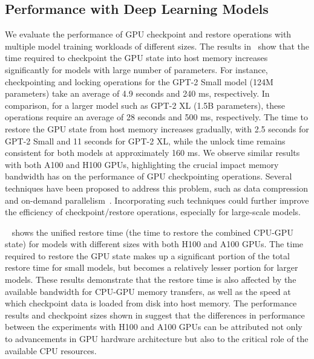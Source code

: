 \subsection{\sys Performance with Deep Learning Models}
\label{sec:eval:diff-models}
%
We evaluate the performance of GPU checkpoint and restore operations with multiple model training workloads of different sizes. The results in~ show that the time required to checkpoint the GPU state into host memory increases significantly for models with large number of parameters.
For instance, checkpointing and locking operations for the GPT-2 Small model (124M parameters) take an average of 4.9 seconds and 240 ms, respectively. In comparison, for a larger model such as GPT-2 XL (1.5B parameters), these operations require an average of 28 seconds and 500 ms, respectively.
The time to restore the GPU state from host memory increases gradually, with 2.5 seconds for GPT-2 Small and 11 seconds for GPT-2 XL, while the unlock time remains consistent for both models at approximately 160 ms.
We observe similar results with both A100 and H100 GPUs, highlighting the crucial impact memory bandwidth has on the performance of GPU checkpointing operations.
Several techniques have been proposed to address this problem, such as data compression and on-demand parallelism~\cite{yang2024on-demand}. Incorporating such techniques could further improve the efficiency of checkpoint/restore operations, especially for large-scale models.

~ shows the unified restore time (the time to restore the combined CPU-GPU state) for models with different sizes with both H100 and A100 GPUs. The time required to restore the GPU state makes up a significant portion of the total restore time for small models, but becomes a relatively lesser portion for larger models. These results demonstrate that the restore time is also affected by the available bandwidth for CPU-GPU memory transfers, as well as the speed at which checkpoint data is loaded from disk into host memory.
The performance results and checkpoint sizes shown in  suggest that the differences in performance between the experiments with H100 and A100 GPUs can be attributed not only to advancements in GPU hardware architecture but also to the critical role of the available CPU resources.



